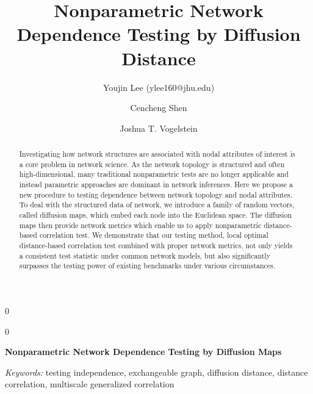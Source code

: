 \documentclass[11pt]{article}
\theoremstyle{definition}
\newcommand{\blind}{0}
\begin{document}
\def\spacingset#1{\renewcommand{\baselinestretch}%
{#1}\small\normalsize} \spacingset{1}

\title{\bf Nonparametric Network Dependence Testing by Diffusion Distance}
\blind
{\author[1]{Youjin Lee (ylee160@jhu.edu)} %
	\author[2]{Cencheng Shen} %
	\author[2,3,4]{Joshua T. Vogelstein}
	\maketitle
} \fi

	\blind
	{
		\bigskip
		\bigskip
		\bigskip
		\begin{center}
			{\LARGE\bf Nonparametric Network Dependence Testing by Diffusion Maps}
		\end{center}
		\medskip
	} \fi

\begin{abstract}
Investigating how network structures are associated with nodal attributes of interest is a core problem in network science. As the network topology is structured and often high-dimensional, many traditional nonparametric tests are no longer applicable and instead parametric approaches are dominant in network inferences. Here we propose a new procedure to testing dependence between network topology and nodal attributes. To deal with the structured data of network, we introduce a family of random vectors, called diffusion maps, which embed each node into the Euclidean space. The diffusion maps then provide network metrics which enable us to apply nonparametric distance-based correlation test. We demonstrate that our testing method, local optimal distance-based correlation test combined with proper network metrics, not only yields a consistent test statistic under common network models, but also significantly surpasses the testing power of existing benchmarks under various circumstances. 
\end{abstract}

\noindent%
{\it Keywords:} testing independence, exchangeable graph, diffusion distance, distance correlation, multiscale generalized correlation
\end{document}
